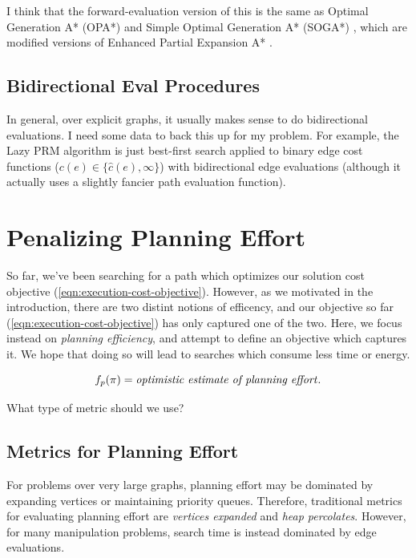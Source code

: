 I think that the forward-evaluation version of this is the same as
Optimal Generation A* (OPA*) and Simple Optimal Generation A* (SOGA*)
\cite{goldenberg2013epeastar},
which are modified versions of
Enhanced Partial Expansion A* \cite{felner2012epastar}.

\subsection{Bidirectional {\sc Eval} Procedures}

In general, over explicit graphs,
it usually makes sense to do bidirectional evaluations.
I need some data to back this up for my problem.
For example,
the Lazy PRM algorithm \cite{bohlin2000lazyprm}
is just best-first search
applied to binary edge cost functions
($c(e) \in \{ \hat{c}(e), \infty \}$)
with bidirectional edge evaluations
(although it actually uses a slightly fancier path evaluation function).

\section{Penalizing Planning Effort}

So far, we've been searching for a path which optimizes our solution
cost objective (\ref{eqn:execution-cost-objective}).
However, as we motivated in the introduction,
there are two distint notions of efficency,
and our objective so far (\ref{eqn:execution-cost-objective})
has only captured one of the two.
Here, we focus instead on \emph{planning efficiency},
and attempt to define an objective which captures it.
We hope that doing so will lead to searches which consume less 
time or energy.

\begin{equation}
   f_p(\pi) = \mbox{\emph{optimistic estimate of planning effort}}.
\end{equation}

What type of metric should we use?

\subsection{Metrics for Planning Effort}

For problems over very large graphs,
planning effort may be dominated by expanding vertices
or maintaining priority queues.
Therefore, traditional metrics for evaluating planning
effort are \emph{vertices expanded}
and \emph{heap percolates}.
However, for many manipulation problems,
search time is instead dominated by edge evaluations.

